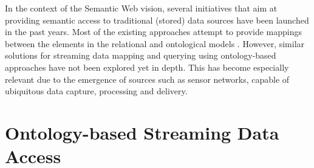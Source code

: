 \documentclass[runningheads,a4paper]{llncs}
\newcommand{\subscript}[1]{\ensuremath{_{\textrm{#1}}}}
\newcommand{\rtwoo}{\textsf{R\subscript{2}O}}
\begin{document}
In the context of the Semantic Web vision, several initiatives that aim at providing semantic access to traditional
(stored) data sources have been launched in the past years. Most of the existing approaches attempt to provide mappings
between the elements in the relational and ontological models \cite{Sahoo_09}.%
However, similar solutions for streaming data mapping and querying using ontology-based approaches have not been explored yet in depth. This has become especially relevant due to the emergence of sources such as sensor networks, capable of ubiquitous data capture, processing and delivery.



\section{Ontology-based Streaming Data Access}
\label{approach}


\end{document}
